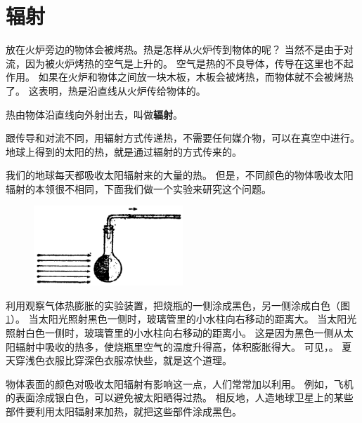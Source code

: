 \section{辐射}\label{sec:2-7}

放在火炉旁边的物体会被烤热。热是怎样从火炉传到物体的呢？
当然不是由于对流，因为被火炉烤热的空气是上升的。
空气是热的不良导体，传导在这里也不起作用。
如果在火炉和物体之间放一块木板，木板会被烤热，而物体就不会被烤热了。
这表明，热是沿直线从火炉传给物体的。

热由物体沿直线向外射出去，叫做\textbf{辐射}。

跟传导和对流不同，用辐射方式传递热，不需要任何媒介物，可以在真空中进行。
地球上得到的太阳的热，就是通过辐射的方式传来的。

我们的地球每天都吸收太阳辐射来的大量的热。
但是，不同颜色的物体吸收太阳辐射的本领很不相同，下面我们做一个实验来研究这个问题。

\begin{figure}[htbp]
    \centering
    \includegraphics[width=0.5\textwidth]{../pic/czwl2-ch2-19}
    \caption{}\label{fig:2-19}
\end{figure}

利用观察气体热膨胀的实验装置，把烧瓶的一侧涂成黑色，另一侧涂成白色（图 \ref{fig:2-19}）。
当太阳光照射黑色一侧时，玻璃管里的小水柱向右移动的距离大。
当太阳光照射白色一侧时，玻璃管里的小水柱向右移动的距离小。
这是因为黑色一侧从太阳辐射中吸收的热多，使烧瓶里空气的温度升得高，体积膨胀得大。
可见，。
夏天穿浅色衣服比穿深色衣服凉快些，就是这个道理。

物体表面的颜色对吸收太阳辐射有影响这一点，人们常常加以利用。
例如，飞机的表面涂成银白色，可以避免被太阳晒得过热。
相反地，人造地球卫星上的某些部件要利用太阳辐射来加热，就把这些部件涂成黑色。


